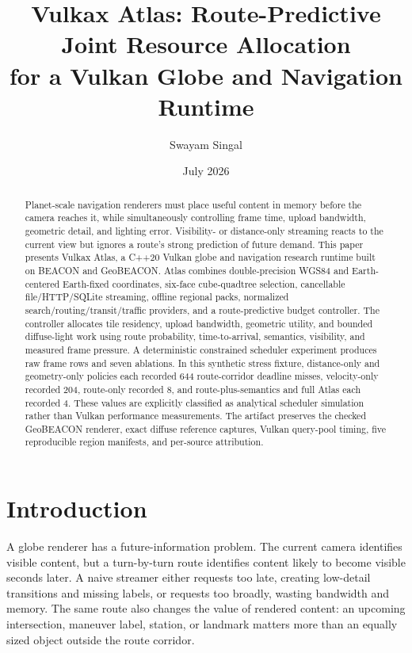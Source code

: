 \documentclass[12pt]{article}
\title{Vulkax Atlas: Route-Predictive Joint Resource Allocation\\
for a Vulkan Globe and Navigation Runtime}
\author{Swayam Singal}
\date{July 2026}
\begin{document}
\maketitle

\begin{abstract}
Planet-scale navigation renderers must place useful content in memory before the camera reaches it,
while simultaneously controlling frame time, upload bandwidth, geometric detail, and lighting
error. Visibility- or distance-only streaming reacts to the current view but ignores a route's
strong prediction of future demand. This paper presents Vulkax Atlas, a C++20 Vulkan globe and
navigation research runtime built on BEACON and GeoBEACON. Atlas combines double-precision WGS84
and Earth-centered Earth-fixed coordinates, six-face cube-quadtree selection, cancellable
file/HTTP/SQLite streaming, offline regional packs, normalized search/routing/transit/traffic
providers, and a route-predictive budget controller. The controller allocates tile residency,
upload bandwidth, geometric utility, and bounded diffuse-light work using route probability,
time-to-arrival, semantics, visibility, and measured frame pressure. A deterministic constrained
scheduler experiment produces raw frame rows and seven ablations. In this synthetic stress fixture,
distance-only and geometry-only policies each recorded 644 route-corridor deadline misses,
velocity-only recorded 204, route-only recorded 8, and route-plus-semantics and full Atlas each
recorded 4. These values are explicitly classified as analytical scheduler simulation rather than
Vulkan performance measurements. The artifact preserves the checked GeoBEACON renderer, exact
diffuse reference captures, Vulkan query-pool timing, five reproducible region manifests, and
per-source attribution.
\end{abstract}

\section{Introduction}
A globe renderer has a future-information problem. The current camera identifies visible content,
but a turn-by-turn route identifies content likely to become visible seconds later. A naive
streamer either requests too late, creating low-detail transitions and missing labels, or requests
too broadly, wasting bandwidth and memory. The same route also changes the value of rendered
content: an upcoming intersection, maneuver label, station, or landmark matters more than an
equally sized object outside the route corridor.
\end{document}
